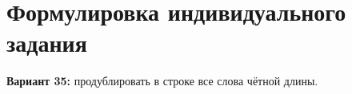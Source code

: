 \section{Формулировка индивидуального задания}

\textbf{Вариант 35:} продублировать в строке все слова чётной длины.
